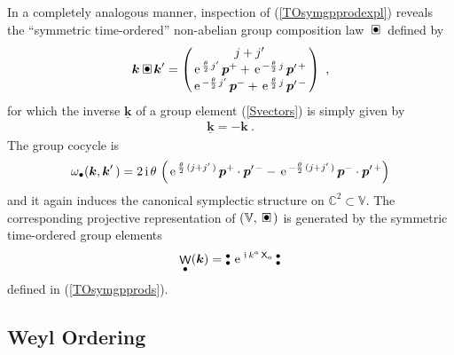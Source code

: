 \documentclass[11pt,a4paper]{article}
\DeclareMathOperator{\weyl}{{\sf W}}                   %
\newcommand{\compb}{\mkern+4mu\square\mkern-17.4mu{\mbox{
    \protect\raisebox{0.2ex}{$\bullet$}}\mkern+5mu}}    %
\newcommand{\NOb}{\mbox{$\substack{\bullet\\\bullet}$}} %
\newcommand{\mbf}[1]{{\boldsymbol {#1} }}
\def\ii{{\,{\rm i}\,}}
\def\X{{\sf X}}
\def\mk{{\mbf k}}
\def\mbp{{\mbf p}}
\def\mbbV{{\mathbb V}}
\newcommand{\complex}{{\mathbb C}} %
\def\e{{\,\rm e}\,}
\newcommand{\beq}{\begin{eqnarray}}
\newcommand{\eeq}{\end{eqnarray}}
\begin{document}
In a completely analogous manner, inspection of
(\ref{TOsymgpprodexpl}) reveals the ``symmetric time-ordered''
non-abelian group composition law $\compb$ defined by
\beq
\mk\compb\mk'=\begin{pmatrix}j+j'\,\\\e^{\frac{\theta}2\,j'}\,\mbp^++
\e^{-\frac{\theta}2\,j}\,\mbp^{\prime\,+}\,\\\e^{-\frac{\theta}2\,j'}\,
\mbp^-+\e^{\frac{\theta}2\,j}\,\mbp^{\prime\,-}\,\end{pmatrix} \ ,
\label{TOsymcomplaw}\eeq
for which the inverse $\underline{\mk}$ of a group element
(\ref{Svectors}) is simply given by
\beq
\underline{\mk}=-\mk \ .
\label{TOsyminverse}\eeq
The group cocycle is
\beq
\omega_\bullet(\mk,\mk'\,)=2\ii\theta\,\left(\e^{\frac{\theta}2\,
(j+j'\,)}\,\mbp^+\cdot\mbp^{\prime\,-}-\e^{-\frac{\theta}2\,
(j+j'\,)}\,\mbp^-\cdot\mbp^{\prime\,+}\right)
\label{TOsymcocycle}\eeq
and it again induces the canonical symplectic structure on
$\complex^2\subset\mbbV$. The corresponding projective representation
of $(\mbbV,\compb)$ is generated by the symmetric time-ordered group
elements
\beq
\weyl_\bullet(\mk)=\NOb\,\e^{\ii k^a\,\X_a}\,\NOb
\label{TOsymweylop}\eeq
defined in (\ref{TOsymgpprods}).

\subsection{Weyl Ordering\label{WOPGWS}}
\end{document}

